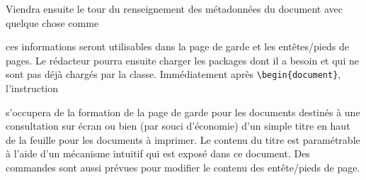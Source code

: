 \documentclass[11pt,report,oneside,solution]{cpgedev}
\begin{document}
Viendra ensuite le tour du renseignement des métadonnées du document avec quelque chose comme 
\begin{latex}[]
\end{latex}
ces informations seront utilisables dans la page de garde et les entêtes/pieds de pages. Le rédacteur pourra ensuite charger les packages dont il a besoin et qui ne sont pas déjà chargés par la classe.  Immédiatement après \lstinline+\begin{document}+, l'instruction 
\begin{latex}[]
\titre  
\end{latex}
s'occupera de la formation de la page de garde pour les documents destinés à une consultation sur écran ou bien (par souci d'économie) d'un simple titre en haut de la feuille pour les documents à imprimer. Le contenu du titre est paramétrable à l'aide d'un mécanisme intuitif qui est exposé dans ce document.
Des commandes sont aussi prévues pour modifier le contenu des entête/pieds de page.
\end{document}
